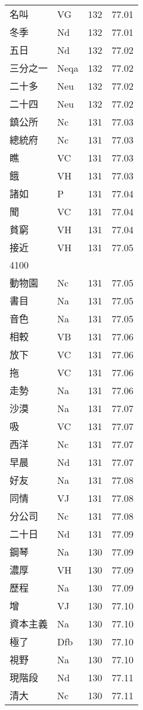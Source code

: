 \documentclass[twocolumn]{book}
\begin{document}
\begin{supertabular}{llrr}
名叫 & VG & 132 &  77.01\\
冬季 & Nd & 132 &  77.01\\
五日 & Nd & 132 &  77.02\\
三分之一 & Neqa & 132 &  77.02\\
二十多 & Neu & 132 &  77.02\\
二十四 & Neu & 132 &  77.02\\
鎮公所 & Nc & 131 &  77.03\\
總統府 & Nc & 131 &  77.03\\
瞧 & VC & 131 &  77.03\\
餓 & VH & 131 &  77.03\\
諸如 & P & 131 &  77.04\\
聞 & VC & 131 &  77.04\\
貧窮 & VH & 131 &  77.04\\
接近 & VH & 131 &  77.05\\
4100\\
動物園 & Nc & 131 &  77.05\\
書目 & Na & 131 &  77.05\\
音色 & Na & 131 &  77.05\\
相較 & VB & 131 &  77.06\\
放下 & VC & 131 &  77.06\\
拖 & VC & 131 &  77.06\\
走勢 & Na & 131 &  77.06\\
沙漠 & Na & 131 &  77.07\\
吸 & VC & 131 &  77.07\\
西洋 & Nc & 131 &  77.07\\
早晨 & Nd & 131 &  77.07\\
好友 & Na & 131 &  77.08\\
同情 & VJ & 131 &  77.08\\
分公司 & Nc & 131 &  77.08\\
二十日 & Nd & 131 &  77.09\\
鋼琴 & Na & 130 &  77.09\\
濃厚 & VH & 130 &  77.09\\
歷程 & Na & 130 &  77.09\\
增 & VJ & 130 &  77.10\\
資本主義 & Na & 130 &  77.10\\
極了 & Dfb & 130 &  77.10\\
視野 & Na & 130 &  77.10\\
現階段 & Nd & 130 &  77.11\\
清大 & Nc & 130 &  77.11\\

\end{supertabular}
\end{document}
